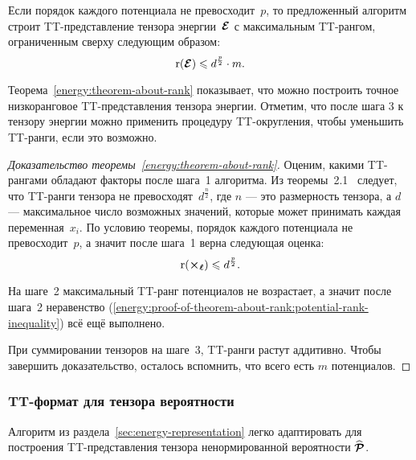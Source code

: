 \begin{theorem}
\label{energy:theorem-about-rank}
Если порядок каждого потенциала не превосходит~$p$, то предложенный алгоритм строит TT\hyp{}представление тензора энергии~$\boldsymbol{\mathcal{E}}$ с максимальным TT\hyp{}рангом, ограниченным сверху следующим образом:
\begin{equation}
\label{energy:theorem-about-rank:inequality}
\operatorname{r}(\boldsymbol{\mathcal{E}}) \leqslant d^{\frac{p}{2}} \cdot m.
\end{equation}
\end{theorem}

Теорема~\ref{energy:theorem-about-rank} показывает, что можно построить точное низкоранговое TT\hyp{}представления тензора энергии. Отметим, что после шага 3 к тензору энергии можно применить процедуру TT\hyp{}округления, чтобы уменьшить TT\hyp{}ранги, если это возможно.

\begin{proof}[Доказательство теоремы~\ref{energy:theorem-about-rank}]
Оценим, какими TT\hyp{}рангами обладают факторы после шага~1 алгоритма.
Из теоремы~2.1~\cite{oseledets2011ttMain} следует, что TT\hyp{}ранги тензора не превосходят~$d^{\frac{n}{2}}$, где $n$ --- это размерность тензора, а $d$ --- максимальное число возможных значений, которые может принимать каждая переменная~$x_i$.
По условию теоремы, порядок каждого потенциала не превосходит~$p$, а значит после шага~1 верна следующая оценка:
\begin{equation}
\label{energy:proof-of-theorem-about-rank:potential-rank-inequality}
\operatorname{r}(\boldsymbol{\mathcal{\Theta_\ell}}) \leqslant d^{\frac{p}{2}}.
\end{equation}

На шаге~2 максимальный TT\hyp{}ранг потенциалов не возрастает, а значит после шага~2 неравенство (\ref{energy:proof-of-theorem-about-rank:potential-rank-inequality}) всё ещё выполнено.

При суммировании тензоров на шаге~3, TT\hyp{}ранги растут аддитивно. Чтобы завершить доказательство, осталось вспомнить, что всего есть $m$ потенциалов.
\end{proof}

\subsubsection{TT\hyp{}формат для тензора вероятности}
\label{sec:prob-representation}
Алгоритм из раздела~\ref{sec:energy-representation} легко адаптировать для построения TT\hyp{}представления тензора ненормированной вероятности $\widehat{\boldsymbol{\mathcal{P}}}$.

